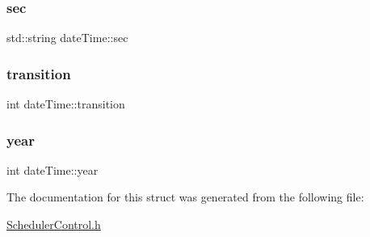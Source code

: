 \subsubsection{\texorpdfstring{sec}{sec}}
{\footnotesize\ttfamily std\+::string date\+Time\+::sec}

\mbox{\label{structdate_time_ac8ace02ecb2dca3441224f4fde17b5b7}} 
\subsubsection{\texorpdfstring{transition}{transition}}
{\footnotesize\ttfamily int date\+Time\+::transition}

\mbox{\label{structdate_time_a6941cd70fc3a57bca830cd1b62eb2826}} 
\subsubsection{\texorpdfstring{year}{year}}
{\footnotesize\ttfamily int date\+Time\+::year}



The documentation for this struct was generated from the following file\+:\begin{DoxyCompactItemize}
\item 
\hyperlink{_scheduler_control_8h}{Scheduler\+Control.\+h}\end{DoxyCompactItemize}

